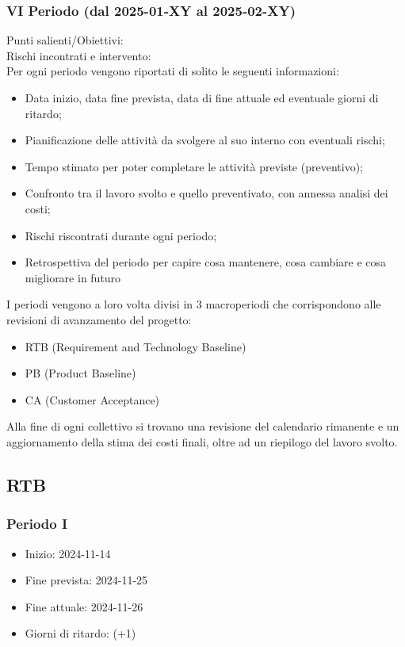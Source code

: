        \subsubsection{VI Periodo (dal 2025-01-XY al 2025-02-XY)}
        Punti salienti/Obiettivi: \\
        Rischi incontrati e intervento:
\\[20pts]
Per ogni periodo vengono riportati di solito le seguenti informazioni:
\begin{itemize}
    \item Data inizio, data fine prevista, data di fine attuale ed eventuale giorni di ritardo;
    \item Pianificazione delle attività da svolgere al suo interno con eventuali rischi;
    \item Tempo stimato per poter completare le attività previste (preventivo);
    \item Confronto tra il lavoro svolto e quello preventivato, con annessa analisi dei costi;
    \item Rischi riscontrati durante ogni periodo;
    \item Retrospettiva del periodo per capire cosa mantenere, cosa cambiare e cosa migliorare in futuro
\end{itemize}

I periodi vengono a loro volta divisi in 3 macroperiodi che corrispondono alle revisioni di avanzamento del progetto:
\begin{itemize}
    \item RTB (Requirement and Technology Baseline)
    \item PB (Product Baseline)
    \item CA (Customer Acceptance)
\end{itemize}
Alla fine di ogni collettivo si trovano una revisione del calendario rimanente e un aggiornamento della stima dei costi finali, oltre ad un riepilogo del lavoro svolto.
\subsection{RTB}
\subsubsection{Periodo I}
\begin{itemize}
    \item Inizio: 2024-11-14
    \item Fine prevista: 2024-11-25
    \item Fine attuale: 2024-11-26
    \item Giorni di ritardo: (+1)
\end{itemize}
